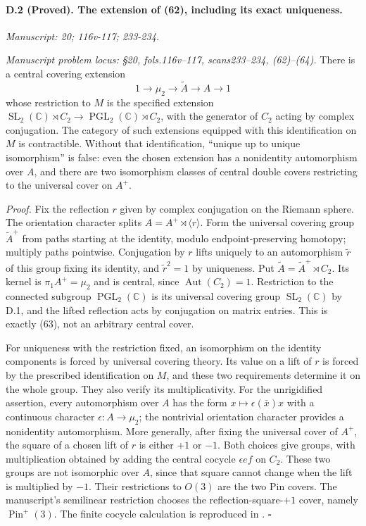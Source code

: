 \paragraph{D.2 (Proved). The extension of (62), including its exact uniqueness.}
\textit{Manuscript: 20; 116v-117; 233-234.}

\emph{Manuscript problem locus: \S20, fols.116v--117, scans233--234, (62)--(64).}
There is a central covering extension
\[
1\longrightarrow\mu_2\longrightarrow\widetilde A
 \longrightarrow A\longrightarrow1
\]
whose restriction to $M$ is the specified extension
$\operatorname{SL}_2(\mathbb C)\rtimes C_2\longrightarrow
\operatorname{PGL}_2(\mathbb C)\rtimes C_2$, with the generator of $C_2$ acting by complex conjugation. The category of such extensions equipped with this identification on $M$ is contractible. Without that identification, ``unique up to unique isomorphism'' is false: even the chosen extension has a nonidentity automorphism over $A$, and there are two isomorphism classes of central double covers restricting to the universal cover on $A^+$.

\emph{Proof.} Fix the reflection $r$ given by complex conjugation on the Riemann sphere. The orientation character splits $A=A^+\rtimes\langle r\rangle$. Form the universal covering group $\widetilde A^+$ from paths starting at the identity, modulo endpoint-preserving homotopy; multiply paths pointwise. Conjugation by $r$ lifts uniquely to an automorphism $\widetilde r$ of this group fixing its identity, and $\widetilde r^2=1$ by uniqueness. Put $\widetilde A=\widetilde A^+\rtimes C_2$. Its kernel is $\pi_1A^+=\mu_2$ and is central, since $\operatorname{Aut}(C_2)=1$. Restriction to the connected subgroup $\operatorname{PGL}_2(\mathbb C)$ is its universal covering group $\operatorname{SL}_2(\mathbb C)$ by D.1, and the lifted reflection acts by conjugation on matrix entries. This is exactly (63), not an arbitrary central cover.

For uniqueness with the restriction fixed, an isomorphism on the identity components is forced by universal covering theory. Its value on a lift of $r$ is forced by the prescribed identification on $M$, and these two requirements determine it on the whole group. They also verify its multiplicativity. For the unrigidified assertion, every automorphism over $A$ has the form $x\mapsto\epsilon(\bar x)x$ with a continuous character $\epsilon:A\to\mu_2$; the nontrivial orientation character provides a nonidentity automorphism. More generally, after fixing the universal cover of $A^+$, the square of a chosen lift of $r$ is either $+1$ or $-1$. Both choices give groups, with multiplication obtained by adding the central cocycle $\epsilon ef$ on $C_2$. These two groups are not isomorphic over $A$, since that square cannot change when the lift is multiplied by $-1$. Their restrictions to $O(3)$ are the two Pin covers. The manuscript's semilinear restriction chooses the reflection-square-$+1$ cover, namely $\operatorname{Pin}^+(3)$. The finite cocycle calculation is reproduced in . \hfill$\square$

